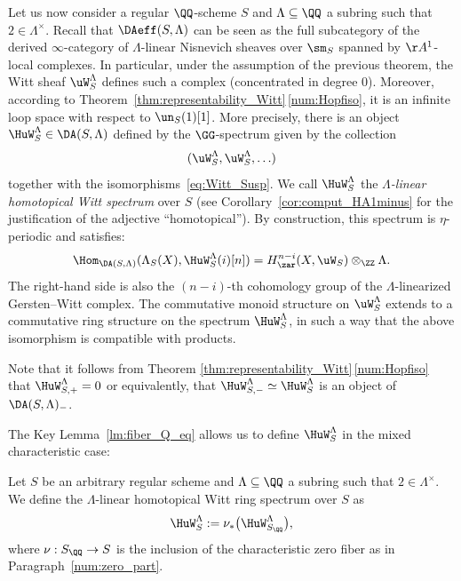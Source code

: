 \begin{num}\label{num:unram_Witt_spectrum}
Let us now consider a regular $\QQ$-scheme $S$ and $\Lambda \subseteq \QQ$ a subring such that $2 \in \Lambda^\times$.
Recall that $\DAeff(S,\Lambda)$ can be seen as the full subcategory
of the derived $\infty$\nobreakdash-cat\-egory of $\Lambda$-linear Nisnevich sheaves over $\sm_S$ spanned by $\AA^1$-local complexes.
In particular, under the assumption of the previous theorem,
the Witt sheaf $\uW^\Lambda_S$ defines such a complex
(concentrated in degree $0$). Moreover,
according to Theorem~\ref{thm:representability_Witt}\,\eqref{num:Hopfiso}, it is an infinite loop space with respect to $\un_S(1)[1]$.
More precisely, there is an object $\HuW^\Lambda_S \in \DA(S,\Lambda)$ defined by the $\GG$-spectrum given by the collection
\[
(\uW^\Lambda_S,\uW^\Lambda_S,\hdots)
\]
together with the isomorphisms~\eqref{eq:Witt_Susp}.
We call $\HuW^\Lambda_S$ the \emph{$\Lambda$-linear homotopical Witt spectrum} over $S$ (see Corollary~\ref{cor:comput_HA1minus} for the justification of the adjective ``homotopical'').
By construction, this spectrum is $\eta$-periodic and satisfies:
\[
\Hom_{\DA(S,\Lambda)}(\Lambda_S(X),\HuW^\Lambda_S(i)[n])=H^{n-i}_\zar(X,\uW_S) \otimes_\ZZ \Lambda.
\]
The right-hand side is also the $(n-i)$-th cohomology group of the $\Lambda$-linearized Gersten--Witt complex.
The commutative monoid structure on $\uW^\Lambda_S$ extends
to a commutative ring structure on the spectrum $\HuW^\Lambda_S$,
in such a way that the above isomorphism is compatible with products.

Note that it follows from Theorem \ref{thm:representability_Witt}\,\eqref{num:Hopfiso}
that $\HuW^\Lambda_{S,+}=0$ or equivalently, that $\HuW^\Lambda_{S,-}\simeq\HuW^\Lambda_S$
is an object of $\DA(S,\Lambda)_-$.
\end{num}

The Key Lemma~\ref{lm:fiber_Q_eq} allows us to define $\HuW^\Lambda_S$ in the mixed characteristic case:
\begin{df}\label{df:HW}
Let $S$ be an arbitrary regular scheme and $\Lambda \subseteq \QQ$
a subring such that $2 \in \Lambda^\times$.
We define the $\Lambda$-linear homotopical Witt ring spectrum
over $S$ as
\[
\HuW^\Lambda_S := \nu_*\big(\HuW^\Lambda_{S_\QQ}\big),
\]
where $\nu:S_\QQ \to S$ is the inclusion of the characteristic zero fiber as in Paragraph~\ref{num:zero_part}.
\end{df}

